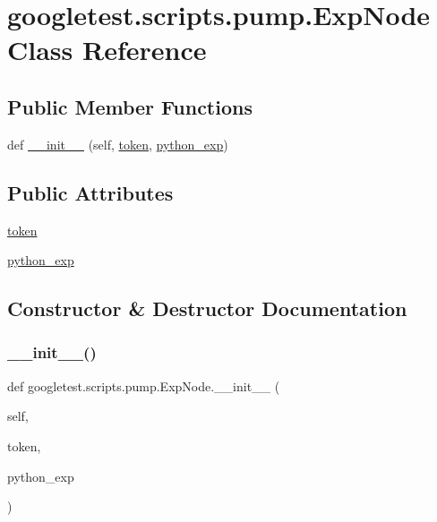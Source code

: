 \hypertarget{classgoogletest_1_1scripts_1_1pump_1_1_exp_node}{}\section{googletest.\+scripts.\+pump.\+Exp\+Node Class Reference}
\label{classgoogletest_1_1scripts_1_1pump_1_1_exp_node}
\subsection*{Public Member Functions}
\begin{DoxyCompactItemize}
\item 
def \mbox{\hyperlink{classgoogletest_1_1scripts_1_1pump_1_1_exp_node_aeda129a6e6f570255361af8c9799fdf9}{\+\_\+\+\_\+init\+\_\+\+\_\+}} (self, \mbox{\hyperlink{classgoogletest_1_1scripts_1_1pump_1_1_exp_node_af616e326c39e42a2c10aeb32eb651f60}{token}}, \mbox{\hyperlink{classgoogletest_1_1scripts_1_1pump_1_1_exp_node_a04168a59b1d7ce522ef8b8b12e4b08bf}{python\+\_\+exp}})
\end{DoxyCompactItemize}
\subsection*{Public Attributes}
\begin{DoxyCompactItemize}
\item 
\mbox{\hyperlink{classgoogletest_1_1scripts_1_1pump_1_1_exp_node_af616e326c39e42a2c10aeb32eb651f60}{token}}
\item 
\mbox{\hyperlink{classgoogletest_1_1scripts_1_1pump_1_1_exp_node_a04168a59b1d7ce522ef8b8b12e4b08bf}{python\+\_\+exp}}
\end{DoxyCompactItemize}


\subsection{Constructor \& Destructor Documentation}
\mbox{\label{classgoogletest_1_1scripts_1_1pump_1_1_exp_node_aeda129a6e6f570255361af8c9799fdf9}} 
\subsubsection{\texorpdfstring{\_\_init\_\_()}{\_\_init\_\_()}}
{\footnotesize\ttfamily def googletest.\+scripts.\+pump.\+Exp\+Node.\+\_\+\+\_\+init\+\_\+\+\_\+ (\begin{DoxyParamCaption}\item[{}]{self,  }\item[{}]{token,  }\item[{}]{python\+\_\+exp }\end{DoxyParamCaption})}



